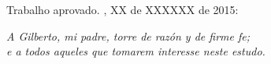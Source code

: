 \begin{folhadeaprovacao}

  \begin{center}
    {\ABNTEXchapterfont\large\imprimirautor}

    \vspace*{\fill}\vspace*{\fill}
    \begin{center}
      \ABNTEXchapterfont\bfseries\Large\imprimirtitulo
    \end{center}
    \vspace*{\fill}
    
    \hspace{.45\textwidth}
    \begin{minipage}{.5\textwidth}
        \imprimirpreambulo
    \end{minipage}%
    \vspace*{\fill}
   \end{center}
        
   Trabalho aprovado. \imprimirlocal, XX de XXXXXX de 2015:

      
   \begin{center}
    \vspace*{0.5cm}
    {\large\imprimirlocal}
    \par
    {\large\imprimirdata}
    \vspace*{1cm}
  \end{center}
  
\end{folhadeaprovacao}


\begin{dedicatoria}
   \vspace*{\fill}
   \centering
   \noindent
   \textit{ A Gilberto, mi padre, torre de razón y de firme fe; \\ e a todos aqueles que tomarem interesse neste estudo.} \vspace*{\fill}
\end{dedicatoria}


